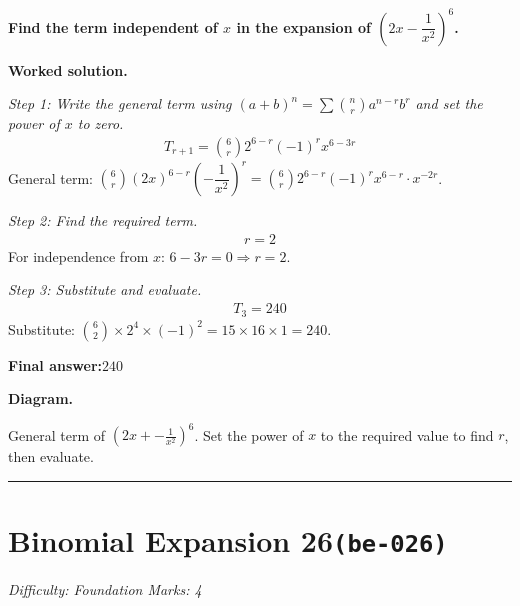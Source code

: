 \documentclass[11pt]{article}
\newcommand{\question}[1]{\par\medskip\noindent\textbf{#1}\par}
\begin{document}
\question{Find the term independent of \( x \) in the expansion of \( \left(2x - \dfrac{1}{x^2}\right)^6 \).}

\textbf{Worked solution.}

\textit{Step 1: Write the general term using \((a+b)^n = \sum \binom{n}{r} a^{n-r} b^r\) and set the power of \(x\) to zero.}
\[\begin{gathered}
T_{r+1} = \binom{6}{r} 2^{6-r}(-1)^r x^{6-3r}
\end{gathered}\]
General term: \( \binom{6}{r}(2x)^{6-r}\left(-\dfrac{1}{x^2}\right)^r = \binom{6}{r} 2^{6-r}(-1)^r x^{6-r} \cdot x^{-2r} \).

\textit{Step 2: Find the required term.}
\[\begin{gathered}
r = 2
\end{gathered}\]
For independence from \(x\): \(6 - 3r = 0 \Rightarrow r = 2\).

\textit{Step 3: Substitute and evaluate.}
\[\begin{gathered}
T_3 = 240
\end{gathered}\]
Substitute: \(\binom{6}{2} \times 2^4 \times (-1)^2 = 15 \times 16 \times 1 = 240\).

\begin{answerbox}
\textbf{Final answer:}\quad \(\displaystyle 240\)
\end{answerbox}
\textbf{Diagram.}

\begin{center}
\end{center}
\small General term of $\left(2x+-\frac{1}{x^{2}}\right)^{6}$. Set the power of $x$ to the required value to find $r$, then evaluate.\normalsize

\medskip\hrule

\section*{Binomial Expansion 26\quad\small\texttt{(be-026)}}
\textit{Difficulty: Foundation \quad\textbar\quad Marks: 4}
\end{document}

